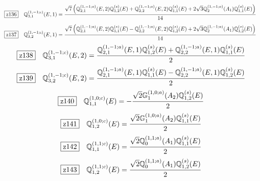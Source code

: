 \documentclass[fleqn,10pt,landscape]{jsarticle}
\begin{document}
\begin{dmath*}
\hspace*{3mm}\fbox{z136}\quad \mathbb{Q}_{3,1}^{(1,-1;c)}(E,1)=\frac{\sqrt{7} \left(\mathbb{Q}_{2,1}^{(1,-1;a)}(E,2) \mathbb{Q}_{1,2}^{(s)}(E) + \mathbb{Q}_{2,2}^{(1,-1;a)}(E,2) \mathbb{Q}_{1,1}^{(s)}(E) + 2 \sqrt{3} \mathbb{Q}_{2}^{(1,-1;a)}(A_{1}) \mathbb{Q}_{1,1}^{(s)}(E)\right)}{14}
\end{dmath*}
\begin{dmath*}
\hspace*{3mm}\fbox{z137}\quad \mathbb{Q}_{3,2}^{(1,-1;c)}(E,1)=\frac{\sqrt{7} \left(\mathbb{Q}_{2,1}^{(1,-1;a)}(E,2) \mathbb{Q}_{1,1}^{(s)}(E) - \mathbb{Q}_{2,2}^{(1,-1;a)}(E,2) \mathbb{Q}_{1,2}^{(s)}(E) + 2 \sqrt{3} \mathbb{Q}_{2}^{(1,-1;a)}(A_{1}) \mathbb{Q}_{1,2}^{(s)}(E)\right)}{14}
\end{dmath*}
\begin{dmath*}
\hspace*{3mm}\fbox{z138}\quad \mathbb{Q}_{3,1}^{(1,-1;c)}(E,2)=\frac{\mathbb{Q}_{2,1}^{(1,-1;a)}(E,1) \mathbb{Q}_{1,2}^{(s)}(E) + \mathbb{Q}_{2,2}^{(1,-1;a)}(E,1) \mathbb{Q}_{1,1}^{(s)}(E)}{2}
\end{dmath*}
\begin{dmath*}
\hspace*{3mm}\fbox{z139}\quad \mathbb{Q}_{3,2}^{(1,-1;c)}(E,2)=\frac{\mathbb{Q}_{2,1}^{(1,-1;a)}(E,1) \mathbb{Q}_{1,1}^{(s)}(E) - \mathbb{Q}_{2,2}^{(1,-1;a)}(E,1) \mathbb{Q}_{1,2}^{(s)}(E)}{2}
\end{dmath*}
\begin{dmath*}
\hspace*{3mm}\fbox{z140}\quad \mathbb{Q}_{1,1}^{(1,0;c)}(E)=- \frac{\sqrt{2} \mathbb{G}_{1}^{(1,0;a)}(A_{2}) \mathbb{Q}_{1,2}^{(s)}(E)}{2}
\end{dmath*}
\begin{dmath*}
\hspace*{3mm}\fbox{z141}\quad \mathbb{Q}_{1,2}^{(1,0;c)}(E)=\frac{\sqrt{2} \mathbb{G}_{1}^{(1,0;a)}(A_{2}) \mathbb{Q}_{1,1}^{(s)}(E)}{2}
\end{dmath*}
\begin{dmath*}
\hspace*{3mm}\fbox{z142}\quad \mathbb{Q}_{1,1}^{(1,1;c)}(E)=\frac{\sqrt{2} \mathbb{Q}_{0}^{(1,1;a)}(A_{1}) \mathbb{Q}_{1,1}^{(s)}(E)}{2}
\end{dmath*}
\begin{dmath*}
\hspace*{3mm}\fbox{z143}\quad \mathbb{Q}_{1,2}^{(1,1;c)}(E)=\frac{\sqrt{2} \mathbb{Q}_{0}^{(1,1;a)}(A_{1}) \mathbb{Q}_{1,2}^{(s)}(E)}{2}
\end{dmath*}
\end{document}
